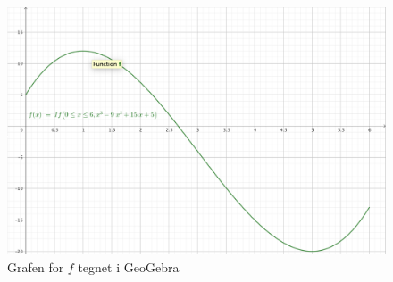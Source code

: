 \documentclass{article}
\begin{document}
\begin{figure}[H]
\begin{center}
  \includegraphics[scale=0.2]{mat18_1.png}
\end{center}
\caption{Grafen for $f$ tegnet i GeoGebra}
\label{fig:1}
\end{figure}
\end{document}
